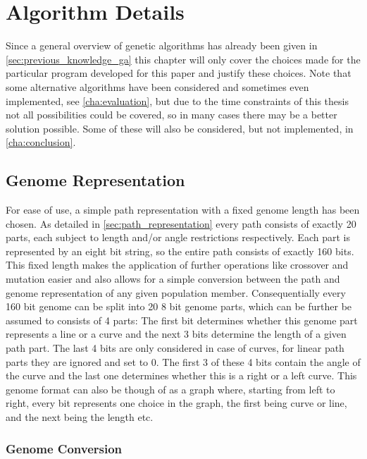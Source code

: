 \chapter{Algorithm Details}
\label{cha:algorithm_details}

Since a general overview of genetic algorithms has already been given in \ref{sec:previous_knowledge_ga} this chapter will only cover the choices made for the particular program developed for this paper and justify these choices. Note that some alternative algorithms have been considered and sometimes even implemented, see \ref{cha:evaluation}, but due to the time constraints of this thesis not all possibilities could be covered, so in many cases there may be a better solution possible. Some of these will also be considered, but not implemented, in \ref{cha:conclusion}. 

\section{Genome Representation}
\label{sec:genome_representation}

For ease of use, a simple path representation with a fixed genome length has been chosen. As detailed in \ref{sec:path_representation} every path consists of exactly 20 parts, each subject to length and/or angle restrictions respectively. Each part is represented by an eight bit string, so the entire path consists of exactly 160 bits. This fixed length makes the application of further operations like crossover and mutation easier and also allows for a simple conversion between the path and genome representation of any given population member. 
Consequentially every 160 bit genome can be split into 20 8 bit genome parts, which can be further be assumed to consists of 4 parts: The first bit determines whether this genome part represents a line or a curve and the next 3 bits determine the length of a given path part. The last 4 bits are only considered in case of curves, for linear path parts they are ignored and set to 0. The first 3 of these 4 bits contain the angle of the curve and the last one determines whether this is a right or a left curve. 
This genome format can also be though of as a graph where, starting from left to right, every bit represents one choice in the graph, the first being curve or line, and the next being the length etc. 

\subsection{Genome Conversion}
\label{sec:genome_conversion}


